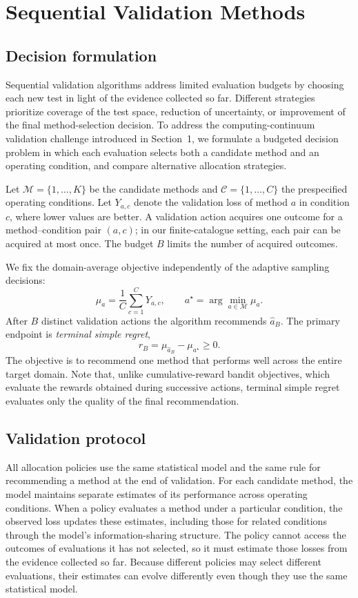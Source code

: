 \documentclass[10pt,a4paper]{article}
\begin{document}
\section{Sequential Validation Methods}
\subsection{Decision formulation}
Sequential validation algorithms address limited evaluation budgets by choosing each new test in light of the evidence collected so far. Different strategies prioritize coverage of the test space, reduction of uncertainty, or improvement of the final method-selection decision. To address the computing-continuum validation challenge introduced in Section~1, we formulate a budgeted decision problem in which each evaluation selects both a candidate method and an operating condition, and compare alternative allocation strategies.

Let $\mathcal{M}=\{1,\ldots,K\}$ be the candidate methods and $\mathcal{C}=\{1,\ldots,C\}$ the prespecified operating conditions. Let $Y_{a,c}$ denote the validation loss of method $a$ in condition $c$, where lower values are better. A validation action acquires one outcome for a method--condition pair $(a,c)$; in our finite-catalogue setting, each pair can be acquired at most once. The budget $B$ limits the number of acquired outcomes.

We fix the domain-average objective independently of the adaptive sampling decisions:
\begin{equation}
\mu_a=\frac{1}{C}\sum_{c=1}^{C}Y_{a,c}, \qquad
a^\star=\arg\min_{a\in\mathcal{M}}\mu_a.
\label{eq:target}
\end{equation}
After $B$ distinct validation actions the algorithm recommends $\widehat{a}_B$. The primary endpoint is \emph{terminal simple regret},
\begin{equation}
r_B=\mu_{\widehat{a}_B}-\mu_{a^\star}\geq0.
\label{eq:regret}
\end{equation}
The objective is to recommend one method that performs well across the entire target domain. Note that, unlike cumulative-reward bandit objectives, which evaluate the rewards obtained during successive actions, terminal simple regret evaluates only the quality of the final recommendation.

\subsection{Validation protocol}
All allocation policies use the same statistical model and the same rule for recommending a method at the end of validation. For each candidate method, the model maintains separate estimates of its performance across operating conditions. When a policy evaluates a method under a particular condition, the observed loss updates these estimates, including those for related conditions through the model's information-sharing structure. The policy cannot access the outcomes of evaluations it has not selected, so it must estimate those losses from the evidence collected so far. Because different policies may select different evaluations, their estimates can evolve differently even though they use the same statistical model.
\end{document}
